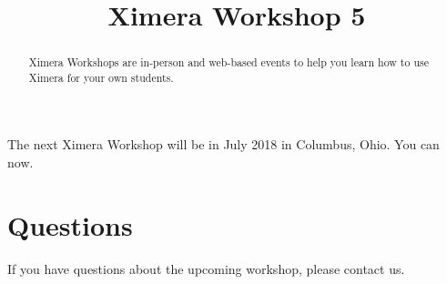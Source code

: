 \documentclass{ximera}
\title{Ximera Workshop 5}
\begin{document}
\begin{abstract}
  Ximera Workshops are in-person and web-based events to help you learn how to use Ximera for your own students.
\end{abstract}
\maketitle

The next Ximera Workshop will be in July 2018 in Columbus, Ohio.  You
can  now.

\section{Questions}

If you have questions about the upcoming workshop, please contact us.
\end{document}

